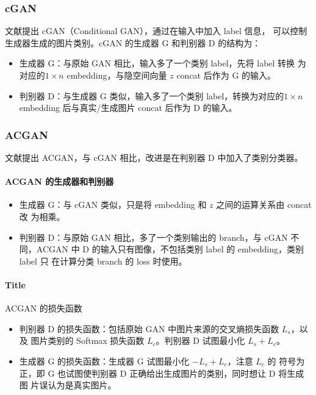 \subsubsection{cGAN}
文献提出 cGAN（Conditional GAN），通过在输入中加入 label 信息，
可以控制生成器生成的图片类别。cGAN 的生成器 G 和判别器 D 的结构为：

\begin{itemize}
  \item 生成器 G：与原始 GAN 相比，输入多了一个类别 label，先将 label 转换
    为对应的$1 \times n$ embedding，与隐空间向量 $z$ concat 后作为 G 的输入。
  \item 判别器 D：与生成器 G 类似，输入多了一个类别 label，转换为对应的$1 \times
    n$ embedding 后与真实/生成图片 concat 后作为 D 的输入。
\end{itemize}

\subsubsection{ACGAN}
文献提出 ACGAN，与 cGAN 相比，改进是在判别器 D 中加入了类别分类器。

\paragraph{ACGAN 的生成器和判别器}
\begin{itemize}
  \item 生成器 G：与 cGAN 类似，只是将 embedding 和 $z$ 之间的运算关系由 concat 改
    为相乘。
  \item 判别器 D：与原始 GAN 相比，多了一个类别输出的 branch，与 cGAN 不
    同，ACGAN 中 D 的输入只有图像，不包括类别 label 的 embedding，类别 label 只
    在计算分类 branch 的 loss 时使用。
\end{itemize}

\paragraph{Title}{ACGAN 的损失函数}
\begin{itemize}
  \item 判别器 D 的损失函数：包括原始 GAN 中图片来源的交叉熵损失函数 $L_{s}$，以及
    图片类别的 Softmax 损失函数 $L_{c}$。判别器 D 试图最小化 $L_{s} + L_{c}$。
  \item 生成器 G 的损失函数：生成器 G 试图最小化 $-L_{s} + L_{c}$，注意 $L_{c}$ 的
    符号为正，即 G 也试图使判别器 D 正确给出生成图片的类别，同时想让 D 将生成图
    片误认为是真实图片。
\end{itemize}

